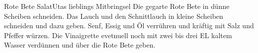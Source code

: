 \begin{recipe}{Rote Bete Salat}{Utas lieblings Mitbringsel}
  \label{Rote Bete Salat}
  \inglist
  \steps
  Die gegarte Rote Bete in dünne Scheiben schneiden. Das Lauch und den
  Schnittlauch in kleine Scheiben schneiden und dazu geben. Senf, Essig und Öl
  verrühren und kräftig mit Salz und Pfeffer würzen. Die Vinaigrette evetnuell
  noch mit zwei bis drei EL kaltem Wasser verdünnen und über die Rote Bete
  geben.
\end{recipe}
